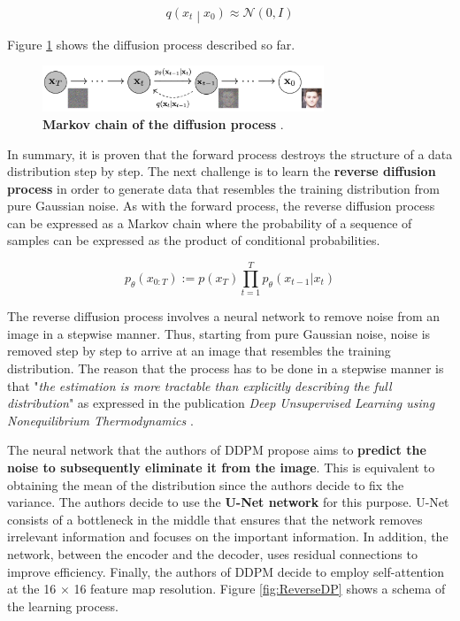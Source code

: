 \[q\left(x_t\middle| x_0\right)\approx\mathcal{N}\left(0,I\right)\]

Figure \ref{fig:MarkovchainDP} shows the diffusion process described so far.

\begin{figure}
    \centering
    \includegraphics[width=0.75\textwidth]{Pictures/MarkovchainDP} 
    \caption{\textbf{Markov chain of the diffusion process} \cite{ho2020denoising}.}
    \label{fig:MarkovchainDP}
\end{figure}

In summary, it is proven that the forward process destroys the structure of a data distribution step by step. The next challenge is to learn the \textbf{reverse diffusion process} in order to generate data that resembles the training distribution from pure Gaussian noise. As with the forward process, the reverse diffusion process can be expressed as a Markov chain where the probability of a sequence of samples can be expressed as the product of conditional probabilities.

\[ p_\theta\left(x_{0:T}\right) := p\left ( x_T \right ) \prod_{t=1}^{T}p_\theta\left ( x_{t-1} | x_t\right ) \]

The reverse diffusion process involves a neural network to remove noise from an image in a stepwise manner. Thus, starting from pure Gaussian noise, noise is removed step by step to arrive at an image that resembles the training distribution. The reason that the process has to be done in a stepwise manner is that "\textit{the estimation is more tractable than explicitly describing the full distribution}" as expressed in the publication \textit{Deep Unsupervised Learning using Nonequilibrium Thermodynamics} \cite{sohl2015deep}.

The neural network that the authors of DDPM propose aims to \textbf{predict the noise to subsequently eliminate it from the image}. This is equivalent to obtaining the mean of the distribution since the authors decide to fix the variance. The authors decide to use the \textbf{U-Net network} \cite{ronneberger2015u} for this purpose. U-Net consists of a bottleneck in the middle that ensures that the network removes irrelevant information and focuses on the important information. In addition, the network, between the encoder and the decoder, uses residual connections to improve efficiency. Finally, the authors of DDPM decide to employ self-attention at the 16 × 16 feature map resolution. Figure \ref{fig:ReverseDP} shows a schema of the learning process.

